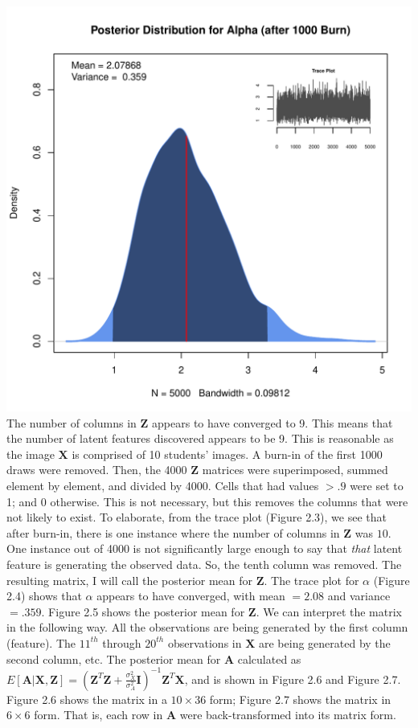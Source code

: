   \includegraphics{images/postAlpha.pdf}
  \vspace{-10mm}
\endmyfig
\noindent
The number of columns in $\bm Z$ appears to have converged to 9. This means
that the number of latent features discovered appears to be 9. This is
reasonable as the image $\bm X$ is comprised of 10 students' images. A burn-in
of the first 1000 draws were removed. Then, the 4000 $\bm Z$ matrices were
superimposed, summed element by element, and divided by 4000. Cells that had
values $> .9$ were set to 1; and 0 otherwise. This is not necessary, but this
removes the columns that were not likely to exist. To elaborate, from the trace
plot (Figure 2.3), we see that after burn-in, there is one instance where the
number of columns in $\bm Z$ was $10$.  One instance out of 4000 is not
significantly large enough to say that \textit{that} latent feature is 
generating the observed data. So, the tenth column was removed. The resulting
matrix, I will call the posterior mean for $\bm Z$.  The trace plot for
$\alpha$ (Figure 2.4) shows that $\alpha$ appears to have converged, with mean
$=2.08$ and variance $=.359$.  Figure 2.5 shows the posterior mean for $\bm Z$.
We can interpret the matrix in the following way. All the observations are 
being generated by the first column (feature). The $11^{th}$ through $20^{th}$
observations in $\bm X$ are being generated by the second column, etc.
The posterior mean for $\bm A$ calculated as $E[\bm{A|X,Z}] = (\bm Z^T\bm Z +
\frac{\sigma_X^2}{\sigma_A^2} \textbf{I})^{-1}\bm Z^T \bm X$, and is shown
in Figure 2.6 and Figure 2.7. Figure 2.6 shows the matrix in a $10 \times 36$ form;
Figure 2.7 shows the matrix in $6 \times 6$ form. That is, each row in $\bm A$
were back-transformed into its matrix form.\\

